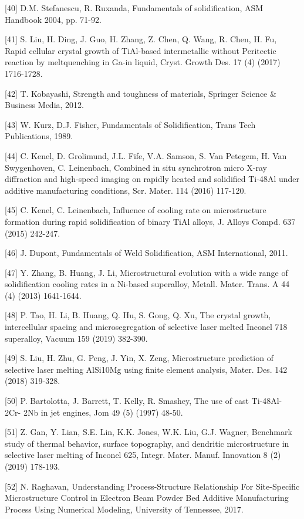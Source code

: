 \documentclass[10pt]{article}
\begin{document}
[40] D.M. Stefanescu, R. Ruxanda, Fundamentals of solidification, ASM Handbook 2004, pp. 71-92.

[41] S. Liu, H. Ding, J. Guo, H. Zhang, Z. Chen, Q. Wang, R. Chen, H. Fu, Rapid cellular crystal growth of TiAl-based intermetallic without Peritectic reaction by meltquenching in Ga-in liquid, Cryst. Growth Des. 17 (4) (2017) 1716-1728.

[42] T. Kobayashi, Strength and toughness of materials, Springer Science \& Business Media, 2012.

[43] W. Kurz, D.J. Fisher, Fundamentals of Solidification, Trans Tech Publications, 1989.

[44] C. Kenel, D. Grolimund, J.L. Fife, V.A. Samson, S. Van Petegem, H. Van Swygenhoven, C. Leinenbach, Combined in situ synchrotron micro X-ray diffraction and high-speed imaging on rapidly heated and solidified Ti-48Al under additive manufacturing conditions, Scr. Mater. 114 (2016) 117-120.

[45] C. Kenel, C. Leinenbach, Influence of cooling rate on microstructure formation during rapid solidification of binary TiAl alloys, J. Alloys Compd. 637 (2015) 242-247.

[46] J. Dupont, Fundamentals of Weld Solidification, ASM International, 2011.

[47] Y. Zhang, B. Huang, J. Li, Microstructural evolution with a wide range of solidification cooling rates in a Ni-based superalloy, Metall. Mater. Trans. A 44 (4) (2013) 1641-1644.

[48] P. Tao, H. Li, B. Huang, Q. Hu, S. Gong, Q. Xu, The crystal growth, intercellular spacing and microsegregation of selective laser melted Inconel 718 superalloy, Vacuum 159 (2019) 382-390.

[49] S. Liu, H. Zhu, G. Peng, J. Yin, X. Zeng, Microstructure prediction of selective laser melting AlSi10Mg using finite element analysis, Mater. Des. 142 (2018) 319-328.

[50] P. Bartolotta, J. Barrett, T. Kelly, R. Smashey, The use of cast Ti-48Al- 2Cr- 2Nb in jet engines, Jom 49 (5) (1997) 48-50.

[51] Z. Gan, Y. Lian, S.E. Lin, K.K. Jones, W.K. Liu, G.J. Wagner, Benchmark study of thermal behavior, surface topography, and dendritic microstructure in selective laser melting of Inconel 625, Integr. Mater. Manuf. Innovation 8 (2) (2019) 178-193.

[52] N. Raghavan, Understanding Process-Structure Relationship For Site-Specific Microstructure Control in Electron Beam Powder Bed Additive Manufacturing Process Using Numerical Modeling, University of Tennessee, 2017.
\end{document}
